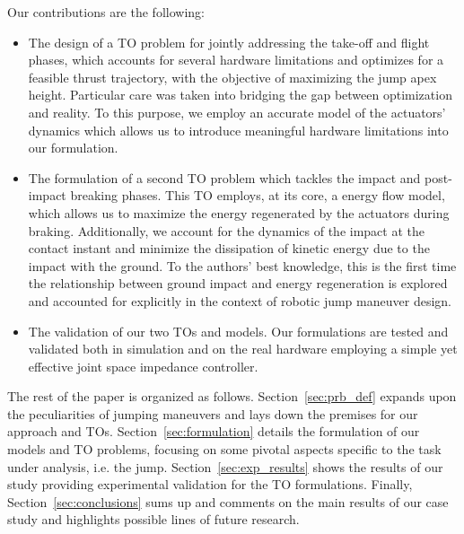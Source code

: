 Our contributions are the following:
\begin{itemize}
    \item The design of a TO problem for jointly addressing the take-off and flight phases, which accounts for several hardware limitations and optimizes for a feasible thrust trajectory, with the objective of maximizing the jump apex height. 
    Particular care was taken into bridging the gap between optimization and reality. To this purpose, we employ an accurate model of the actuators' dynamics which allows us to introduce meaningful hardware limitations into our formulation.
    \item The formulation of a second TO problem which tackles the impact and post-impact breaking phases. This TO employs, at its core, a energy flow model, which allows us to maximize the energy regenerated by the actuators during braking. Additionally, we account for the dynamics of the impact at the contact instant and minimize the dissipation of kinetic energy due to the impact with the ground. To the authors' best knowledge, this is the first time the relationship between ground impact and energy regeneration is explored and accounted for explicitly in the context of robotic jump maneuver design.
    \item The validation of our two TOs and models. Our formulations are tested and validated both in simulation and on the real hardware employing a simple yet effective joint space impedance controller.
\end{itemize}
The rest of the paper is organized as follows. Section~\ref{sec:prb_def} expands upon the peculiarities of jumping maneuvers and lays down the premises for our approach and TOs. Section~\ref{sec:formulation} details the formulation of our models and TO problems, focusing on some pivotal aspects specific to the task under analysis, i.e. the jump. Section~\ref{sec:exp_results} shows the results of our study providing experimental validation for the TO formulations. Finally, Section~\ref{sec:conclusions} sums up and comments on the main results of our case study and highlights possible lines of future research.  
